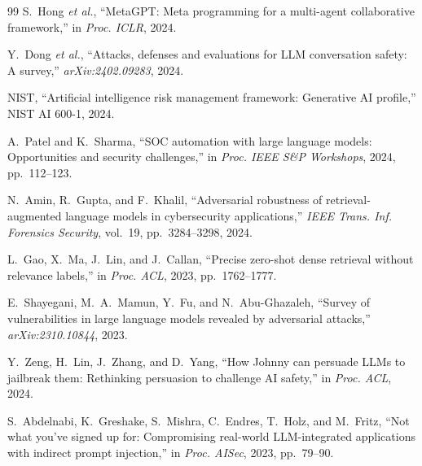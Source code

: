 \documentclass[journal,twoside]{IEEEtran}
\begin{document}
\begin{thebibliography}{99}
S.~Hong \emph{et al.}, ``MetaGPT: Meta programming for a multi-agent collaborative framework,'' in \emph{Proc. ICLR}, 2024.

Y.~Dong \emph{et al.}, ``Attacks, defenses and evaluations for LLM conversation safety: A survey,'' \emph{arXiv:2402.09283}, 2024.

{NIST}, ``Artificial intelligence risk management framework: Generative AI profile,'' NIST AI 600-1, 2024.

A.~Patel and K.~Sharma, ``SOC automation with large language models: Opportunities and security challenges,'' in \emph{Proc. IEEE S\&P Workshops}, 2024, pp.~112--123.

N.~Amin, R.~Gupta, and F.~Khalil, ``Adversarial robustness of retrieval-augmented language models in cybersecurity applications,'' \emph{IEEE Trans. Inf. Forensics Security}, vol.~19, pp.~3284--3298, 2024.

L.~Gao, X.~Ma, J.~Lin, and J.~Callan, ``Precise zero-shot dense retrieval without relevance labels,'' in \emph{Proc. ACL}, 2023, pp.~1762--1777.

E.~Shayegani, M.~A.~Mamun, Y.~Fu, and N.~Abu-Ghazaleh, ``Survey of vulnerabilities in large language models revealed by adversarial attacks,'' \emph{arXiv:2310.10844}, 2023.

Y.~Zeng, H.~Lin, J.~Zhang, and D.~Yang, ``How Johnny can persuade LLMs to jailbreak them: Rethinking persuasion to challenge AI safety,'' in \emph{Proc. ACL}, 2024.

S.~Abdelnabi, K.~Greshake, S.~Mishra, C.~Endres, T.~Holz, and M.~Fritz, ``Not what you've signed up for: Compromising real-world LLM-integrated applications with indirect prompt injection,'' in \emph{Proc. AISec}, 2023, pp.~79--90.

\end{thebibliography}
\end{document}
